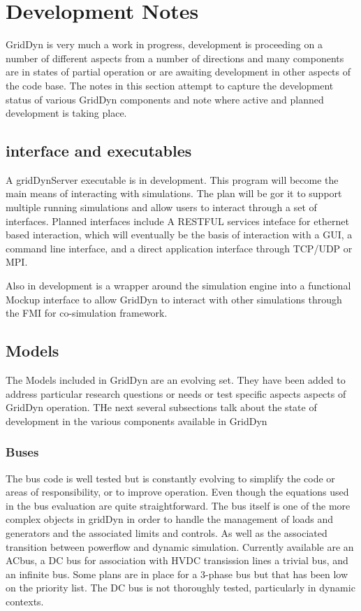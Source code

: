 \documentclass[12pt]{article} %
\begin{document}
\section{Development Notes}
GridDyn is very much a work in progress,  development is proceeding on a number of different aspects from a number of directions and many components are in states of partial operation or are awaiting development in other aspects of the code base.  The notes in this section attempt to capture the development status of various GridDyn components and note where active and planned development is taking place.  
\subsection{interface and executables}
A gridDynServer executable is in development.  This program will become the main means of interacting with simulations.  The plan will be gor it to support multiple running simulations and allow users to interact through a set of interfaces.  Planned interfaces include A RESTFUL services inteface for ethernet based interaction, which will eventually be the basis of interaction with a GUI, a command line interface, and a direct application interface through TCP/UDP or MPI.  

Also in development is a wrapper around the simulation engine into a functional Mockup interface to allow GridDyn to interact with other simulations through the FMI for co-simulation framework.  

\subsection{Models}
The Models included in GridDyn are an evolving set.  They have been added to address particular research questions or needs or test specific aspects aspects of GridDyn operation.  THe next several subsections talk about the state of development in the various components available in GridDyn
\subsubsection{Buses}
The bus code is well tested but is constantly evolving to simplify the code or areas of responsibility, or to improve operation.  Even though the equations used in the bus evaluation are quite straightforward.  The bus itself is one of the more complex objects in gridDyn in order to handle the management of loads and generators and the associated limits and controls.  As well as the associated transition between powerflow and dynamic simulation.  Currently available are an ACbus, a DC bus for association with HVDC transission lines a trivial bus, and an infinite bus.  Some plans are in place for a 3-phase bus but that has been low on the priority list.  The DC bus is not thoroughly tested, particularly in dynamic contexts.  
\end{document}

